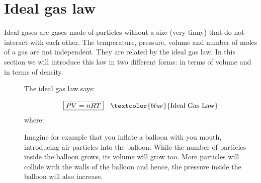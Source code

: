 \documentclass[main.tex]{subfiles}
\begin{document}
\section{Ideal gas law}
Ideal gases are gases made of particles without a size (very tinny) that do not interact with each other. The temperature, pressure, volume and number of moles of a gas are not independent. They are related by the ideal gas law. In this section we will introduce this law in two different forms: in terms of volume and in terms of density.
\sloppy 
\begin{description}
\item[] 
The ideal gas law says:%

\begin{equation*}\begin{split}
\boxed{  PV=nRT} \quad \textcolor{blue}{\text{Ideal Gas Law}}
\end{split}\end{equation*}
where:
Imagine for example that you inflate a balloon with you mouth, introducing air particles into the balloon.
While the number of particles inside the balloon grows, its volume will grow too. More particles will collide with the walls of the balloon and hence, the pressure inside the balloon will also increase. 


\end{description}
\end{document}
